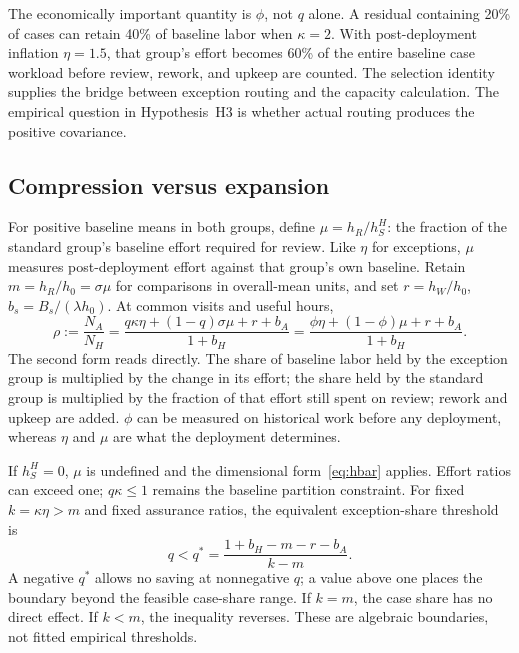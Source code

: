 The economically important quantity is $\phi$, not $q$ alone. A residual containing 20\% of cases can
retain 40\% of baseline labor when $\kappa=2$. With post-deployment inflation $\eta=1.5$, that group's
effort becomes 60\% of the entire baseline case workload before review, rework, and upkeep are
counted. The selection identity supplies the bridge between exception routing and the capacity
calculation. The empirical question in Hypothesis~H3 is whether actual routing produces the positive
covariance.

\subsection{Compression versus expansion}
\label{sec:compression}

For positive baseline means in both groups, define $\mu=h_R/h_S^H$: the fraction of the standard
group's baseline effort required for review. Like $\eta$ for exceptions, $\mu$ measures
post-deployment effort against that group's own baseline. Retain $m=h_R/h_0=\sigma\mu$ for
comparisons in overall-mean units, and set $r=h_W/h_0$, $b_s=B_s/(\lambda h_0)$. At common visits and
useful hours,
\begin{equation}
\rho := \frac{N_A}{N_H}
 = \frac{q\kappa\eta+(1-q)\sigma\mu+r+b_A}{1+b_H}
 = \frac{\phi\eta+(1-\phi)\mu+r+b_A}{1+b_H}. \label{eq:rho}
\end{equation}
The second form reads directly. The share of baseline labor held by the exception group is multiplied
by the change in its effort; the share held by the standard group is multiplied by the fraction of
that effort still spent on review; rework and upkeep are added. $\phi$ can be measured on historical
work before any deployment, whereas $\eta$ and $\mu$ are what the deployment determines.

If $h_S^H=0$, $\mu$ is undefined and the dimensional form~\eqref{eq:hbar} applies. Effort ratios can
exceed one; $q\kappa\le 1$ remains the baseline partition constraint. For fixed $k=\kappa\eta>m$ and
fixed assurance ratios, the equivalent exception-share threshold is
\begin{equation}
q<q^{*}=\frac{1+b_H-m-r-b_A}{k-m}. \label{eq:qstar}
\end{equation}
A negative $q^{*}$ allows no saving at nonnegative $q$; a value above one places the boundary beyond
the feasible case-share range. If $k=m$, the case share has no direct effect. If $k<m$, the inequality
reverses. These are algebraic boundaries, not fitted empirical thresholds.

